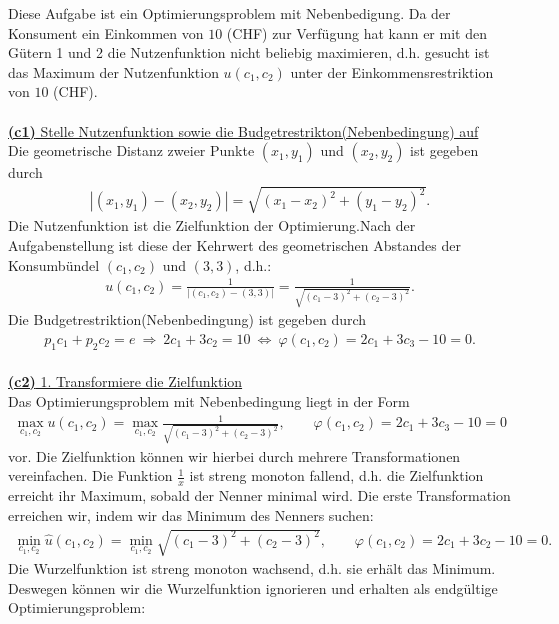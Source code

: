 Diese Aufgabe ist ein Optimierungsproblem mit Nebenbedigung.
Da der Konsument ein Einkommen von $10$ (CHF) zur Verfügung hat kann er mit den Gütern 1 und 2  die Nutzenfunktion nicht beliebig maximieren, d.h. gesucht ist das Maximum der Nutzenfunktion $u(c_1,c_2)$ unter der Einkommensrestriktion von $10$ (CHF).\\
\\
\underline{\textbf{(c1)} Stelle Nutzenfunktion sowie die Budgetrestrikton(Nebenbedingung) auf}\\
Die geometrische Distanz zweier Punkte $(x_1,y_1)$ und $(x_2,y_2)$ ist gegeben durch
\begin{align*}
	\left|(x_1,y_1) - (x_2,y_2) \right|
	=
	\sqrt{(x_1 -x_2)^2 + (y_1-y_2)^2}. 
\end{align*}
Die Nutzenfunktion ist die Zielfunktion der Optimierung.Nach der Aufgabenstellung ist diese der Kehrwert des geometrischen Abstandes der Konsumbündel $(c_1,c_2)$ und $(3,3)$, d.h.:
\begin{align*}
	u(c_1,c_2)
	=
	\frac{1}{\left|(c_1,c_2) - (3,3) \right|}
	=
	\frac{1}{\sqrt{(c_1 -3)^2 + (c_2-3)^2}}.
\end{align*}
Die Budgetrestriktion(Nebenbedingung) ist gegeben durch
\begin{align*}
	p_1 c_1 + p_2 c_2= e 
	\ \Rightarrow \
	2 c_1 + 3 c_2 = 10
	\ \Leftrightarrow \
	\varphi(c_1,c_2) = 2 c_1 + 3c_3 - 10= 0.
\end{align*} 
\  \\
\underline{\textbf{(c2)} 1. Transformiere die Zielfunktion}\\
Das Optimierungsproblem mit Nebenbedingung liegt in der Form 
\begin{align*}
	\max \limits_{c_1,c_2} u(c_1,c_2)
	=
	\max \limits_{c_1,c_2} \frac{1}{\sqrt{(c_1 -3)^2 + (c_2-3)^2}}
	, \qquad \varphi(c_1,c_2) = 2 c_1 + 3c_3 - 10= 0
\end{align*}
vor. Die Zielfunktion können wir hierbei durch mehrere Transformationen vereinfachen. Die Funktion $\frac{1}{x}$ ist streng monoton fallend, d.h. die Zielfunktion erreicht ihr Maximum, sobald der Nenner minimal wird. Die erste Transformation erreichen wir, indem wir das Minimum des Nenners suchen:
\begin{align*}
	\min \limits_{c_1,c_2}
	\hat{u}(c_1,c_2)
	=
	\min \limits_{c_1,c_2} \sqrt{(c_1 -3)^2 + (c_2-3)^2}
	, \qquad \varphi(c_1,c_2) = 2 c_1 + 3c_2 - 10= 0.
\end{align*}
Die Wurzelfunktion ist streng monoton wachsend, d.h. sie erhält das Minimum. Deswegen können wir die Wurzelfunktion ignorieren und erhalten als endgültige Optimierungsproblem:
